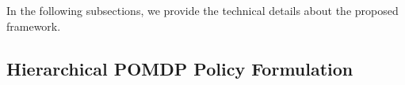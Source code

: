 \documentclass[letterpaper]{article} %
\begin{document}
In the following subsections, we provide the technical details about the proposed framework.



\subsection{Hierarchical POMDP Policy Formulation}
\label{ssec:hierarchical_policy}

\end{document}
